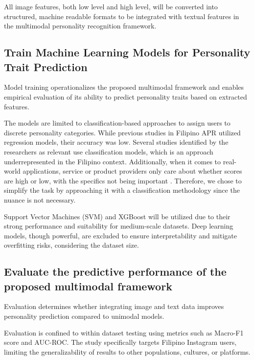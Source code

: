 	All image features, both low level and high level, will be converted into structured, machine readable formats to be integrated with textual features in the multimodal personality recognition framework.
	
	\subsection{Train Machine Learning Models for Personality Trait Prediction
	}
	
	Model training operationalizes the proposed multimodal framework and enables empirical evaluation of its ability to predict personality traits based on extracted features.

	The models are limited to classification-based approaches to assign users to discrete personality categories. While previous studies in Filipino APR utilized regression models, their accuracy was low. Several studies identified by the researchers as relevant use classification models, which is an approach underrepresented in the Filipino context. Additionally, when it comes to real-world applications, service or product providers only care about whether scores are high or low, with the specifics not being important \citep{wei2017beyond}. Therefore, we chose to simplify the task by approaching it with a classification methodology since the nuance is not necessary.

	Support Vector Machines (SVM) and XGBoost will be utilized due to their strong performance and suitability for medium-scale datasets. Deep learning models, though powerful, are excluded to ensure interpretability and mitigate overfitting risks, considering the dataset size.
	
	\subsection{Evaluate the predictive performance of the proposed multimodal framework}
	
	Evaluation determines whether integrating image and text data improves personality prediction compared to unimodal models.
	
	Evaluation is confined to within dataset testing using metrics such as Macro-F1 score and AUC-ROC. The study specifically targets Filipino Instagram users, limiting the generalizability of results to other populations, cultures, or platforms.
	


